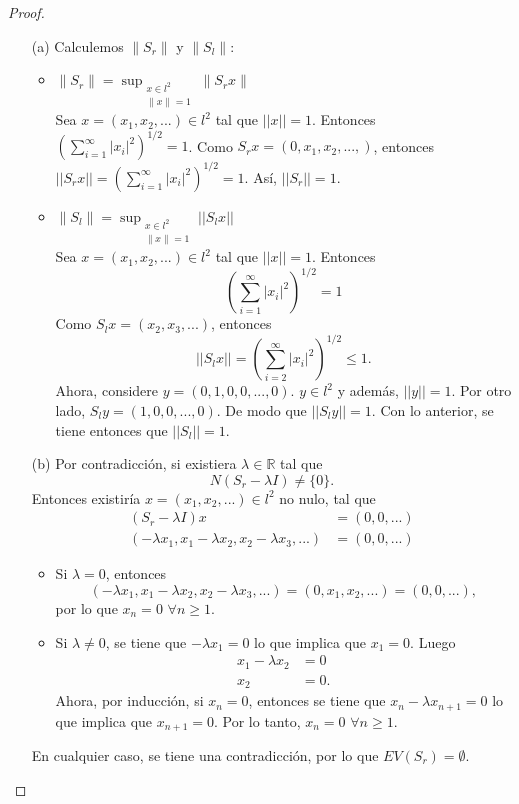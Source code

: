 \begin{proof}
    \begin{enumerate}
        \item[(a)] Calculemos $\|S_r\|$ y $\|S_{l}\|$:
        \begin{itemize}
            \item $\displaystyle\|S_r\| = \sup_{\substack{x \in l^2 \\ \|x\|=1}} \|S_r x\|$ \\
Sea $x=(x_{1},x_{2},...)\in l^{2}$ tal que $||x||=1$.
Entonces $\displaystyle\left(\sum_{i=1}^{\infty}|x_{i}|^{2}\right)^{1/2}=1$.
Como $S_r x=(0,x_{1},x_{2},...,)$, entonces $\displaystyle||S_r x||=\left(\sum_{i=1}^{\infty}|x_{i}|^{2}\right)^{1/2}=1$.
Así, $||S_{r}||=1$.
\item $\displaystyle\|S_{l}\|= \sup_{\substack{x \in l^2  \\\|x\|=1}} ||S_{l}x||$ \\
Sea $x=(x_{1},x_{2},...)\in l^{2}$ tal que $||x||=1$.
Entonces \[\left(\sum_{i=1}^{\infty}|x_{i}|^{2}\right)^{1/2}=1\]
Como $S_{l}x=(x_{2},x_{3},...)$, entonces \[||S_{l}x||=\left(\sum_{i=2}^{\infty}|x_{i}|^{2}\right)^{1/2}\leq 1.\]
Ahora, considere $y=(0,1,0,0,...,0)$.
$y\in l^{2}$ y además, $||y||=1$.
Por otro lado, $S_{l}y=(1,0,0,...,0)$.
De modo que $||S_{l}y||=1$.
Con lo anterior, se tiene entonces que $||S_{l}||=1$.
\end{itemize}
\item[(b)] Por contradicción, si existiera $\lambda\in\mathbb{R}$ tal que \[N(S_r-\lambda I)\neq\{0\}.\]
Entonces existiría $x=(x_{1},x_{2},...)\in l^2$ no nulo, tal que 
\begin{align*}
(S_{r}-\lambda I)x&=(0,0,...)
\\(-\lambda x_{1},x_{1}-\lambda x_{2},x_2-\lambda x_3,...) &= (0,0,...)
\end{align*}
\begin{itemize}
    \item Si $\lambda=0$, entonces
    \[(-\lambda x_{1},x_{1}-\lambda x_{2},x_2-\lambda x_3,...)=(0,x_{1},x_{2},...)=(0,0,...),\] por lo que $x_n=0$ $\forall n\ge 1$.
\item Si $\lambda\ne0$, se tiene que $-\lambda x_{1}=0$ lo que implica que $x_{1}=0$. Luego \begin{align*}
    x_{1}-\lambda x_{2}&=0 \\  x_2&=0.
\end{align*}
Ahora, por inducción, si $x_n=0$, entonces se tiene que $x_{n}-\lambda x_{n+1}=0$ lo que implica que $x_{n+1}=0$.
Por lo tanto, $x_{n}=0$ $\forall n\ge1.$
\end{itemize}
En cualquier caso, se tiene una contradicción, por lo que $EV(S_{r})=\emptyset$.
    

\end{enumerate}
\end{proof}
